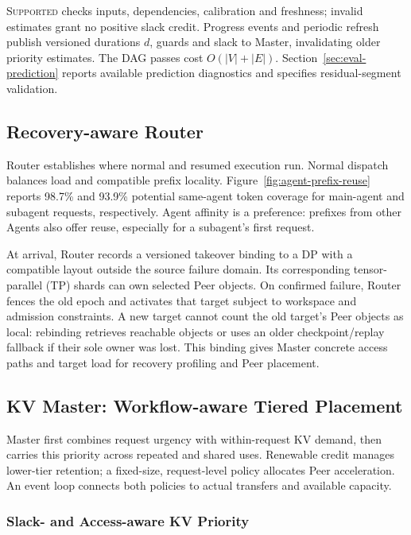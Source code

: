 \textsc{Supported} checks inputs, dependencies, calibration and freshness;
invalid estimates grant no positive slack credit. Progress events and
periodic refresh publish versioned durations $d$, guards and slack to
Master, invalidating older priority estimates. The DAG passes cost
$O(|V|+|E|)$. Section~\ref{sec:eval-prediction} reports available prediction
diagnostics and specifies residual-segment validation.

\subsection{Recovery-aware Router}
\label{sec:recovery-router}

Router establishes where normal and resumed execution run. Normal
dispatch balances load and compatible prefix locality.
Figure~\ref{fig:agent-prefix-reuse} reports 98.7\% and 93.9\% potential
same-agent token coverage for main-agent and subagent requests,
respectively. Agent affinity is a preference: prefixes from other Agents
also offer reuse, especially for a subagent's first request.

At arrival, Router records a versioned takeover binding to a DP with a
compatible layout outside the source failure domain. Its corresponding
tensor-parallel (TP) shards can own selected Peer objects. On confirmed
failure, Router fences the old epoch and activates that target subject
to workspace and admission constraints. A new target cannot count the
old target's Peer objects as local: rebinding retrieves reachable objects
or uses an older checkpoint/replay fallback if their sole owner was lost.
This binding gives Master concrete access paths and target load for
recovery profiling and Peer placement.

\subsection{KV Master: Workflow-aware Tiered Placement}
\label{sec:kv-master}

Master first combines request urgency with within-request KV demand,
then carries this priority across repeated and shared uses. Renewable
credit manages lower-tier retention; a fixed-size, request-level policy
allocates Peer acceleration. An event loop connects both policies to
actual transfers and available capacity.

\subsubsection{Slack- and Access-aware KV Priority}
\label{sec:placement-value}
\label{sec:prefix-value}

